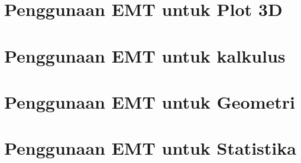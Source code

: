 \documentclass{report}
\begin{document}
\newpage
\chapter{Penggunaan EMT untuk Plot 3D}


\newpage
\chapter{Penggunaan EMT untuk kalkulus}


\newpage
\chapter{Penggunaan EMT untuk Geometri}


\newpage
\chapter{Penggunaan EMT untuk Statistika}

\end{document}
